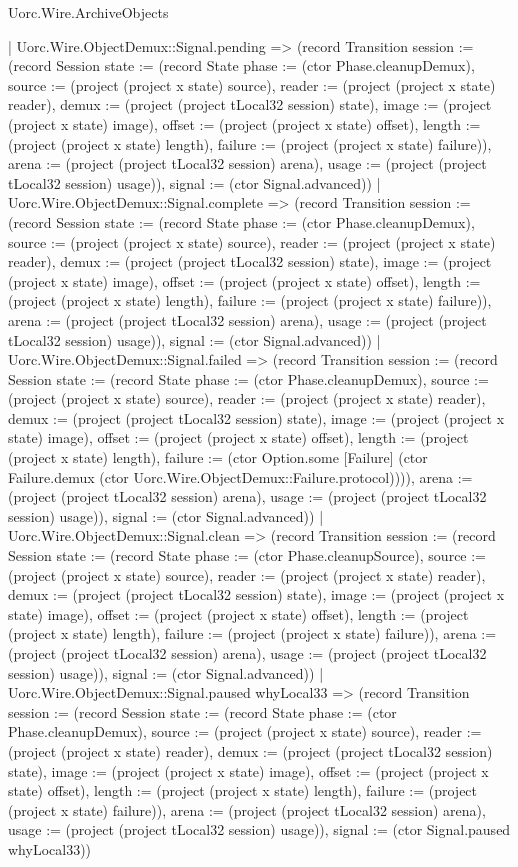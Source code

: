 \begin{lexlean}{Uorc.Wire.ArchiveObjects}
\begin{semanticmodule}
{      | Uorc.Wire.ObjectDemux::Signal.pending => (record Transition {session := (record Session {state := (record State {phase := (ctor Phase.cleanupDemux), source := (project (project x state) source), reader := (project (project x state) reader), demux := (project (project tLocal32 session) state), image := (project (project x state) image), offset := (project (project x state) offset), length := (project (project x state) length), failure := (project (project x state) failure)}), arena := (project (project tLocal32 session) arena), usage := (project (project tLocal32 session) usage)}), signal := (ctor Signal.advanced)})
      | Uorc.Wire.ObjectDemux::Signal.complete => (record Transition {session := (record Session {state := (record State {phase := (ctor Phase.cleanupDemux), source := (project (project x state) source), reader := (project (project x state) reader), demux := (project (project tLocal32 session) state), image := (project (project x state) image), offset := (project (project x state) offset), length := (project (project x state) length), failure := (project (project x state) failure)}), arena := (project (project tLocal32 session) arena), usage := (project (project tLocal32 session) usage)}), signal := (ctor Signal.advanced)})
      | Uorc.Wire.ObjectDemux::Signal.failed => (record Transition {session := (record Session {state := (record State {phase := (ctor Phase.cleanupDemux), source := (project (project x state) source), reader := (project (project x state) reader), demux := (project (project tLocal32 session) state), image := (project (project x state) image), offset := (project (project x state) offset), length := (project (project x state) length), failure := (ctor Option.some [Failure] (ctor Failure.demux (ctor Uorc.Wire.ObjectDemux::Failure.protocol)))}), arena := (project (project tLocal32 session) arena), usage := (project (project tLocal32 session) usage)}), signal := (ctor Signal.advanced)})
      | Uorc.Wire.ObjectDemux::Signal.clean => (record Transition {session := (record Session {state := (record State {phase := (ctor Phase.cleanupSource), source := (project (project x state) source), reader := (project (project x state) reader), demux := (project (project tLocal32 session) state), image := (project (project x state) image), offset := (project (project x state) offset), length := (project (project x state) length), failure := (project (project x state) failure)}), arena := (project (project tLocal32 session) arena), usage := (project (project tLocal32 session) usage)}), signal := (ctor Signal.advanced)})
      | Uorc.Wire.ObjectDemux::Signal.paused whyLocal33 => (record Transition {session := (record Session {state := (record State {phase := (ctor Phase.cleanupDemux), source := (project (project x state) source), reader := (project (project x state) reader), demux := (project (project tLocal32 session) state), image := (project (project x state) image), offset := (project (project x state) offset), length := (project (project x state) length), failure := (project (project x state) failure)}), arena := (project (project tLocal32 session) arena), usage := (project (project tLocal32 session) usage)}), signal := (ctor Signal.paused whyLocal33)})
}
\end{semanticmodule}
\end{lexlean}
